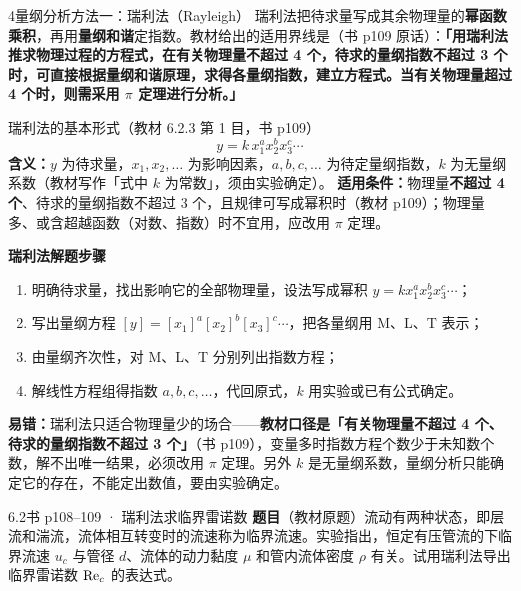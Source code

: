 \begin{kaodian}{4}{量纲分析方法一：瑞利法（Rayleigh）}
瑞利法把待求量写成其余物理量的\textbf{幂函数乘积}，再用\textbf{量纲和谐}定指数。教材给出的适用界线是（书 p109 原话）：\textbf{「用瑞利法推求物理过程的方程式，在有关物理量不超过 4 个，待求的量纲指数不超过 3 个时，可直接根据量纲和谐原理，求得各量纲指数，建立方程式。当有关物理量超过 4 个时，则需采用 $\pi$ 定理进行分析。」}

\begin{gongshi}{瑞利法的基本形式（教材 6.2.3 第 1 目，书 p109）}
\[ y=k\,x_1^{a}x_2^{b}x_3^{c}\cdots \]
\textbf{含义：}$y$ 为待求量，$x_1,x_2,\dots$ 为影响因素，$a,b,c,\dots$ 为待定量纲指数，$k$ 为无量纲系数（教材写作「式中 $k$ 为常数」，须由实验确定）。
\textbf{适用条件：}物理量\textbf{不超过 4 个}、待求的量纲指数不超过 3 个，且规律可写成幂积时（教材 p109）；物理量多、或含超越函数（对数、指数）时不宜用，应改用 $\pi$ 定理。
\end{gongshi}

\begin{banfa}
\textbf{瑞利法解题步骤}
\begin{enumerate}
\item 明确待求量，找出影响它的全部物理量，设法写成幂积 $y=k x_1^{a}x_2^{b}x_3^{c}\cdots$；
\item 写出量纲方程 $[y]=[x_1]^{a}[x_2]^{b}[x_3]^{c}\cdots$，把各量纲用 M、L、T 表示；
\item 由量纲齐次性，对 M、L、T 分别列出指数方程；
\item 解线性方程组得指数 $a,b,c,\dots$，代回原式，$k$ 用实验或已有公式确定。
\end{enumerate}
\end{banfa}

\begin{yicuo}
\textbf{易错：}瑞利法只适合物理量少的场合——\textbf{教材口径是「有关物理量不超过 4 个、待求的量纲指数不超过 3 个」}（书 p109），变量多时指数方程个数少于未知数个数，解不出唯一结果，必须改用 $\pi$ 定理。另外 $k$ 是无量纲系数，量纲分析只能确定它的存在，不能定出数值，要由实验确定。
\end{yicuo}

\begin{liti}{6.2}{书 p108--109 · 瑞利法求临界雷诺数}
\textbf{题目}（教材原题）流动有两种状态，即层流和湍流，流体相互转变时的流速称为临界流速。实验指出，恒定有压管流的下临界流速 $u_c$ 与管径 $d$、流体的动力黏度 $\mu$ 和管内流体密度 $\rho$ 有关。试用瑞利法导出临界雷诺数 $\mathrm{Re}_c$ 的表达式。


\end{liti}
\end{kaodian}
